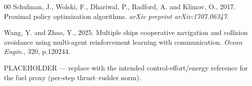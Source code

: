 \documentclass[final,5p,times,twocolumn]{elsarticle}
\begin{document}
\begin{thebibliography}{00}
Schulman, J., Wolski, F., Dhariwal, P., Radford, A. and Klimov, O., 2017. Proximal policy optimization algorithms. \textit{arXiv preprint arXiv:1707.06347}.

Wang, Y. and Zhao, Y., 2025. Multiple ships cooperative navigation and collision avoidance using multi-agent reinforcement learning with communication. \textit{Ocean Engin.}, 320, p.120244.

PLACEHOLDER --- replace with the intended control-effort/energy reference for the fuel proxy (per-step thrust--rudder norm).

\end{thebibliography}
\end{document}
